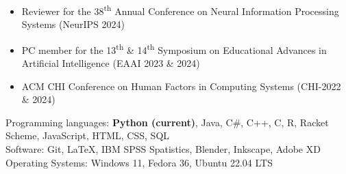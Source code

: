 
\begin{small} \color{black}
\begin{itemize}
    \setlength\itemsep{-0.25em}
    \item Reviewer for the 38\textsuperscript{th} Annual Conference on Neural Information Processing Systems (NeurIPS 2024)
    \item PC member for the 13\textsuperscript{th} \& 14\textsuperscript{th} Symposium on Educational Advances in Artificial Intelligence (EAAI 2023 \& 2024)
    \item ACM CHI Conference on Human Factors in Computing Systems (CHI-2022 \& 2024)
\end{itemize}
\end{small}

\vspace{-10pt}

\begin{small} \color{black}
Programming languages: \textbf{Python (current)}, Java, C\#, C++, C, R, Racket Scheme, JavaScript, HTML, CSS, SQL \\
Software: Git, \LaTeX, IBM SPSS Spatistics, Blender, Inkscape, Adobe XD \\
Operating Systems: Windows 11, Fedora 36, Ubuntu 22.04 LTS \\
\end{small}


